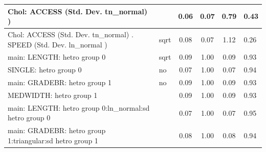 \begin{table}
\begin{center}
\begin{tabular}{|l|l|c|c|c|l|}
			\hline
			 Chol: ACCESS (Std. Dev. tn_normal) ) &  & 0.06 & 0.07 & 0.79 & 0.43 \\
			\hline
			 Chol: ACCESS (Std. Dev. tn_normal) . SPEED (Std. Dev.   ln_normal ) & sqrt & 0.08 & 0.07 & 1.12 & 0.26 \\
			\hline
			main: LENGTH: hetro group 0 & sqrt & 0.09 & 1.00 & 0.09 & 0.93 \\
			\hline
			SINGLE: hetro group 0 & no & 0.07 & 1.00 & 0.07 & 0.94 \\
			\hline
			main: GRADEBR: hetro group 1 & no & 0.09 & 1.00 & 0.09 & 0.93 \\
			\hline
			MEDWIDTH: hetro group 1 &  & 0.09 & 1.00 & 0.09 & 0.93 \\
			\hline
			main: LENGTH: hetro group 0:ln_normal:sd  hetro group 0 &  & 0.07 & 1.00 & 0.07 & 0.95 \\
			\hline
			main: GRADEBR: hetro group 1:triangular:sd  hetro group 1 &  & 0.08 & 1.00 & 0.08 & 0.94 \\
			\hline
		\end{tabular}
	\end{center}
\end{table}